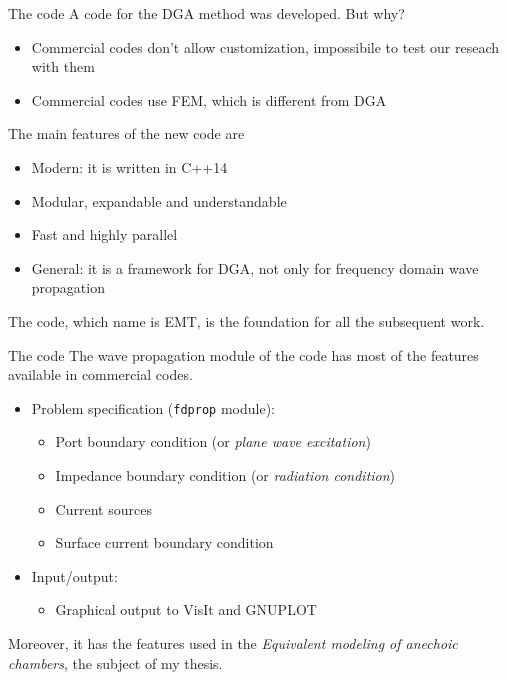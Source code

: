 \documentclass{beamer}
\begin{document}
\begin{frame}{The code}
    A code for the DGA method was developed. But why?
    \begin{itemize}
        \item Commercial codes don't allow customization, impossibile to test our reseach with them
        \item Commercial codes use FEM, which is different from DGA
    \end{itemize}
    The main features of the new code are
    \begin{itemize}
        \item Modern: it is written in C++14
        \item Modular, expandable and understandable
        \item Fast and highly parallel
        \item General: it is a framework for DGA, not only for frequency domain wave propagation
    \end{itemize}
    The code, which name is EMT, is the foundation for all the subsequent work.
\end{frame}

\begin{frame}{The code}
    The wave propagation module of the code has most of the features available in commercial codes.
    \begin{itemize}
        \item Problem specification (\texttt{fdprop} module):
        \begin{itemize}
            \item Port boundary condition (or \emph{plane wave excitation})
            \item Impedance boundary condition (or \emph{radiation condition})
            \item Current sources
            \item Surface current boundary condition
        \end{itemize}
        \item Input/output:
        \begin{itemize}
            \item Graphical output to VisIt and GNUPLOT
        \end{itemize}
    \end{itemize}
    Moreover, it has the features used in the \emph{Equivalent modeling of anechoic chambers}, the subject of my thesis.
\end{frame}
\end{document}
